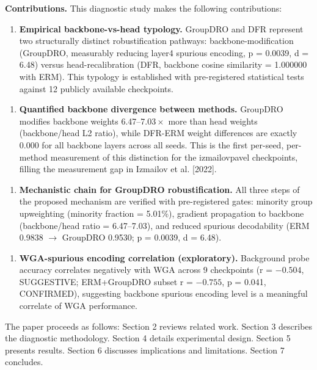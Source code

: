 \textbf{Contributions.} This diagnostic study makes the following contributions:

\begin{enumerate}
\item \textbf{Empirical backbone-vs-head typology.} GroupDRO and DFR represent two structurally distinct robustification pathways: backbone-modification (GroupDRO, measurably reducing layer4 spurious encoding, p = 0.0039, d = 6.48) versus head-recalibration (DFR, backbone cosine similarity = 1.000000 with ERM). This typology is established with pre-registered statistical tests against 12 publicly available checkpoints.
\end{enumerate}

\begin{enumerate}
\item \textbf{Quantified backbone divergence between methods.} GroupDRO modifies backbone weights 6.47--7.$03\times$ more than head weights (backbone/head L2 ratio), while DFR-ERM weight differences are exactly 0.000 for all backbone layers across all seeds. This is the first per-seed, per-method measurement of this distinction for the izmailovpavel checkpoints, filling the measurement gap in Izmailov et al. [2022].
\end{enumerate}

\begin{enumerate}
\item \textbf{Mechanistic chain for GroupDRO robustification.} All three steps of the proposed mechanism are verified with pre-registered gates: minority group upweighting (minority fraction = 5.01\%), gradient propagation to backbone (backbone/head ratio = 6.47--7.03), and reduced spurious decodability (ERM 0.9838 $\rightarrow$ GroupDRO 0.9530; p = 0.0039, d = 6.48).
\end{enumerate}

\begin{enumerate}
\item \textbf{WGA-spurious encoding correlation (exploratory).} Background probe accuracy correlates negatively with WGA across 9 checkpoints (r = $-0.504$, SUGGESTIVE; ERM+GroupDRO subset r = $-0.755$, p = 0.041, CONFIRMED), suggesting backbone spurious encoding level is a meaningful correlate of WGA performance.
\end{enumerate}

The paper proceeds as follows: Section 2 reviews related work. Section 3 describes the diagnostic methodology. Section 4 details experimental design. Section 5 presents results. Section 6 discusses implications and limitations. Section 7 concludes.

